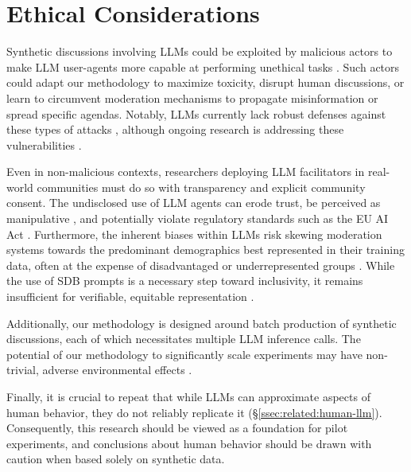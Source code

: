 %
\section{Ethical Considerations}
\label{sec:ethical}

Synthetic discussions involving LLMs could be exploited by malicious actors to make LLM user-agents more capable at performing unethical tasks \cite{majumdar_2024_nefarious, MARULLI20245340}. Such actors could adapt our methodology to  maximize toxicity, disrupt human discussions, or learn to circumvent moderation mechanisms to propagate misinformation or spread specific agendas. Notably, LLMs currently lack robust defenses against these types of attacks \cite{li_2025_vulnerable}, although ongoing research is addressing these vulnerabilities \cite{wang_2025_risk}.

Even in non-malicious contexts, researchers deploying LLM facilitators in real-world communities must do so with transparency and explicit community consent. The undisclosed use of LLM agents can erode trust, be perceived as manipulative \cite{retraction_watch}, and potentially violate regulatory standards such as the EU AI Act \cite{eu_ai_act_2024}. Furthermore, the inherent biases within LLMs risk skewing moderation systems towards the predominant demographics best represented in their training data, often at the expense of disadvantaged or underrepresented groups \cite{rossi_2024, anthis_2025, burton2024large}. While the use of SDB prompts is a necessary step toward inclusivity, it remains insufficient for verifiable, equitable representation \cite{rossi_2024}.

Additionally, our methodology is designed around batch production of synthetic discussions, each of which necessitates multiple LLM inference calls. The potential of our methodology to significantly scale experiments may have non-trivial, adverse environmental effects \cite{ding_2024_sustainable, Ren2024}. 

Finally, it is crucial to repeat that while LLMs can approximate aspects of human behavior, they do not reliably replicate it (\S\ref{ssec:related:human-llm}). Consequently, this research should be viewed as a foundation for pilot experiments, and conclusions about human behavior should be drawn with caution when based solely on synthetic data.